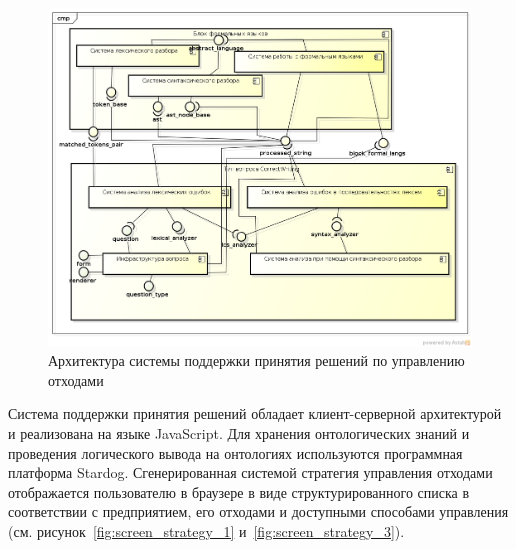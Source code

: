 \documentclass[a4paper]{G2-105}
\begin{document}
\begin{figure}[H]
\centering
\includegraphics[scale=0.7]{component}
\caption{Архитектура системы поддержки принятия решений по управлению отходами}
\label{fig:architecture}
\end{figure}

Система поддержки принятия решений обладает клиент-серверной архитектурой и реализована на языке JavaScript. Для хранения онтологических знаний и проведения логического вывода на онтологиях используются программная платформа Stardog. Сгенерированная системой стратегия управления отходами отображается пользователю в браузере в виде структурированного списка в соответствии с предприятием, его отходами и доступными способами управления (см. рисунок~\ref{fig:screen_strategy_1} и~\ref{fig:screen_strategy_3}). 



\end{document}
